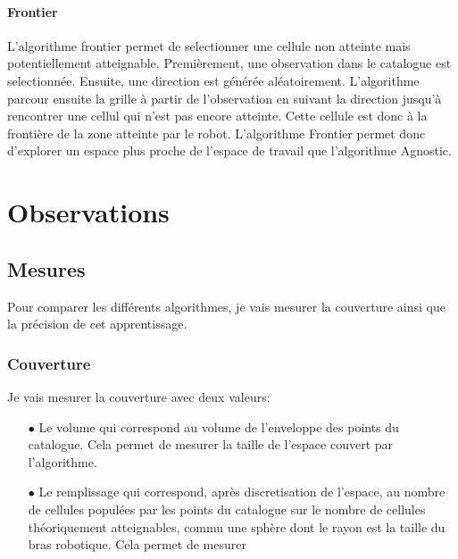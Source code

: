 \documentclass[11pt,french]{report}
\begin{document}
\subsubsection{Frontier}

L'algorithme frontier permet de selectionner une cellule non atteinte mais potentiellement atteignable. Premièrement, une observation dans le catalogue est selectionnée. Ensuite, une direction est générée aléatoirement. L'algorithme parcour ensuite la grille à partir de l'observation en suivant la direction jusqu'à rencontrer une cellul qui n'est pas encore atteinte. Cette cellule est donc à la frontière de la zone atteinte par le robot. L'algorithme Frontier permet donc d'explorer un espace plus proche de l'espace de travail que l'algorithme Agnostic.



\chapter{Observations}

\section{Mesures}
Pour comparer les différents algorithmes, je vais mesurer la couverture ainsi que la précision de cet apprentissage.

\subsection{Couverture}
Je vais mesurer la couverture avec deux valeurs:
\begin{itemize}
    \item[$\bullet$] Le volume qui correspond au volume de l'enveloppe des points du catalogue. Cela permet de mesurer la taille de l'espace couvert par l'algorithme.
    \item[$\bullet$] Le remplissage qui correspond, après discretisation de l'espace, au nombre de cellules populées par les points du catalogue sur le nombre de cellules théoriquement atteignables, commu une sphère dont le rayon est la taille du bras robotique. Cela permet de mesurer
\end{itemize}
\end{document}
